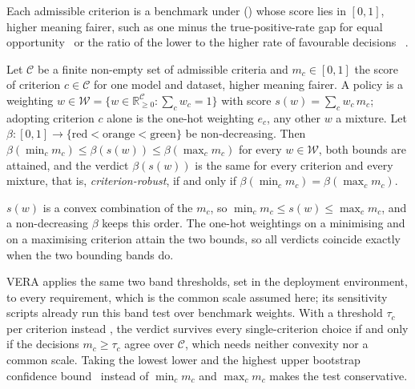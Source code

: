 Each admissible criterion is a benchmark under  () whose score lies in $[0,1]$, higher meaning fairer, such as one minus the true-positive-rate gap for equal opportunity~\cite{hardt2016equality} or the ratio of the lower to the higher rate of favourable decisions~\cite{feldman2015certifying} .

\begin{proposition}\label{prop:criterion}
Let $\mathcal{C}$ be a finite non-empty set of admissible criteria and $m_c\in[0,1]$ the score of criterion $c\in\mathcal{C}$ for one model and dataset, higher meaning fairer.
A policy is a weighting $w\in\mathcal{W}=\{w\in\mathbb{R}_{\ge 0}^{\mathcal{C}}:\sum_{c}w_c=1\}$ with score $s(w)=\sum_{c}w_c\,m_c$; adopting criterion $c$ alone is the one-hot weighting $e_c$, any other $w$ a mixture.
Let $\beta:[0,1]\to\{\mathrm{red}<\mathrm{orange}<\mathrm{green}\}$ be non-decreasing.
Then $\beta(\min_c m_c)\le\beta(s(w))\le\beta(\max_c m_c)$ for every $w\in\mathcal{W}$, both bounds are attained, and the verdict $\beta(s(w))$ is the same for every criterion and every mixture, that is, \emph{criterion-robust}, if and only if $\beta(\min_c m_c)=\beta(\max_c m_c)$.
\end{proposition}
\begin{IEEEproof}
$s(w)$ is a convex combination of the $m_c$, so $\min_c m_c\le s(w)\le\max_c m_c$, and a non-decreasing $\beta$ keeps this order.
The one-hot weightings on a minimising and on a maximising criterion attain the two bounds, so all verdicts coincide exactly when the two bounding bands do.
\end{IEEEproof}

VERA applies the same two band thresholds, set in the deployment environment, to every requirement, which is the common scale assumed here; its sensitivity scripts already run this band test over benchmark weights.
With a threshold $\tau_c$ per criterion instead , the verdict survives every single-criterion choice if and only if the decisions $m_c\ge\tau_c$ agree over $\mathcal{C}$, which needs neither convexity nor a common scale.
\ifarmreduced\else
Taking the lowest lower and the highest upper bootstrap confidence bound~\cite{efron1993} instead of $\min_c m_c$ and $\max_c m_c$ makes the test conservative.
\fi

